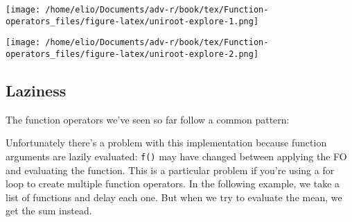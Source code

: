\texttt{[image: /home/elio/Documents/adv-r/book/tex/Function-operators\_files/figure-latex/uniroot-explore-1.png]}

\begin{Shaded}
\begin{Highlighting}[]
 \NormalTok{); }\NormalTok{(} \NormalTok{, } \NormalTok{)}
\end{Highlighting}
\end{Shaded}

\texttt{[image: /home/elio/Documents/adv-r/book/tex/Function-operators\_files/figure-latex/uniroot-explore-2.png]}

\hypertarget{laziness}{%
\subsection{Laziness}\label{laziness}}

The function operators we've seen so far follow a common pattern:

\begin{Shaded}
\begin{Highlighting}[]
\StringTok{ }
\StringTok{ }
\NormalTok{  \}}
\NormalTok{\}}
\end{Highlighting}
\end{Shaded}

Unfortunately there's a problem with this implementation because
function arguments are lazily evaluated: \texttt{f()} may have changed
between applying the FO and evaluating the function. This is a
particular problem if you're using a for loop to create multiple
function operators. In the following example, we take a list of
functions and delay each one. But when we try to evaluate the mean, we
get the sum instead. 

\begin{Shaded}
\begin{Highlighting}[]
\StringTok{ }\NormalTok{(}

\StringTok{ }\NormalTok{(}\NormalTok{, }
 
\StringTok{ } \NormalTok{)}
\NormalTok{\}}
\OperatorTok{$}\NormalTok{(}\OperatorTok{:}\NormalTok{)}
\end{Highlighting}
\end{Shaded}

